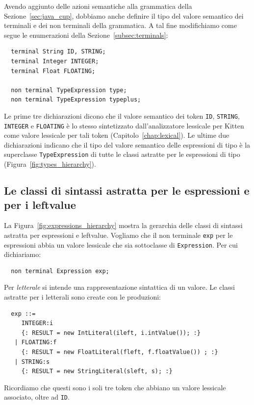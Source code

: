 Avendo aggiunto delle azioni semantiche alla grammatica della
Sezione~\ref{sec:java_cup}, dobbiamo anche definire il tipo del valore
semantico dei terminali e dei non terminali della grammatica.
A tal fine modifichiamo come segue le
enumerazioni della Sezione~\ref{subsec:terminals}:
%
\begin{verbatim}
  terminal String ID, STRING;
  terminal Integer INTEGER;
  terminal Float FLOATING;

  non terminal TypeExpression type;
  non terminal TypeExpression typeplus;
\end{verbatim}
%
Le prime tre dichiarazioni dicono che il valore semantico dei token
\texttt{ID}, \texttt{STRING}, \texttt{INTEGER} e \texttt{FLOATING}
\`e lo stesso sintetizzato dall'analizzatore lessicale per Kitten
come valore lessicale per tali token (Capitolo~\ref{chap:lexical}).
Le ultime due dichiarazioni indicano che
il tipo del valore semantico delle espressioni di tipo \`e
la superclasse \texttt{TypeExpression} di tutte le classi astratte per
le espressioni di tipo (Figura~\ref{fig:types_hierarchy}).
%
\subsection{Le classi di sintassi astratta per le espressioni e per i leftvalue}
  \label{subsec:expressions_abstract}
%
La Figura~\ref{fig:expressions_hierarchy} mostra la gerarchia delle classi
di sintassi astratta per espressioni e leftvalue.
Vogliamo che il non terminale \texttt{exp} per le espressioni abbia
un valore lessicale che sia sottoclasse di \texttt{Expression}. Per
cui dichiariamo:
%
\begin{verbatim}
  non terminal Expression exp;
\end{verbatim}

Per \emph{letterale} si intende una rappresentazione sintattica di un
valore. Le classi astratte per i letterali sono create con le produzioni:
%
\begin{verbatim}
  exp ::=
     INTEGER:i
     {: RESULT = new IntLiteral(ileft, i.intValue()); :}
   | FLOATING:f
     {: RESULT = new FloatLiteral(fleft, f.floatValue()) ; :}
   | STRING:s
     {: RESULT = new StringLiteral(sleft, s); :}
\end{verbatim}
%
Ricordiamo che questi sono i soli tre token che abbiano un valore
lessicale associato, oltre ad \texttt{ID}.


